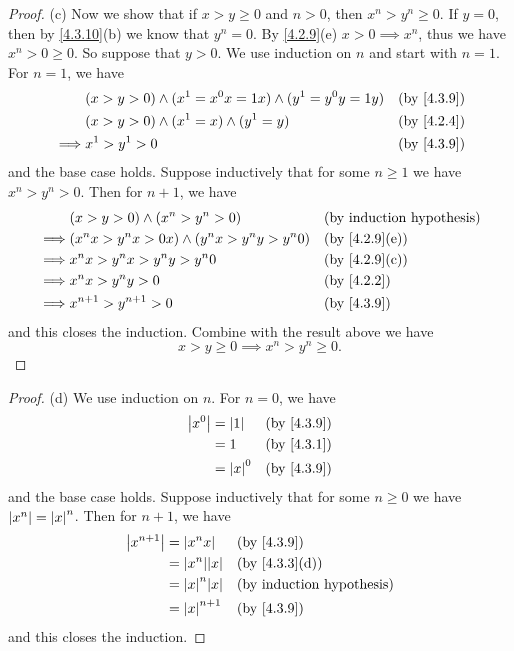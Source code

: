 \begin{proof}{(c)}
  Now we show that if \(x > y \geq 0\) and \(n > 0\), then \(x^n > y^n \geq 0\).
  If \(y = 0\), then by \cref{4.3.10}(b) we know that \(y^n = 0\).
  By \cref{4.2.9}(e) \(x > 0 \implies x^n\), thus we have \(x^n > 0 \geq 0\).
  So suppose that \(y > 0\).
  We use induction on \(n\) and start with \(n = 1\).
  For \(n = 1\), we have
  \begin{align*}
             & (x > y > 0) \land (x^1 = x^0 x = 1x) \land (y^1 = y^0 y = 1y) &  & \text{(by \cref{4.3.9})} \\
             & (x > y > 0) \land (x^1 = x) \land (y^1 = y)                   &  & \text{(by \cref{4.2.4})} \\
    \implies & x^1 > y^1 > 0                                                 &  & \text{(by \cref{4.3.9})}
  \end{align*}
  and the base case holds.
  Suppose inductively that for some \(n \geq 1\) we have \(x^n > y^n > 0\).
  Then for \(n + 1\), we have
  \begin{align*}
             & (x > y > 0) \land (x^n > y^n > 0)                  &  & \text{(by induction hypothesis)} \\
    \implies & (x^n x > y^n x > 0x) \land (y^n x > y^n y > y^n 0) &  & \text{(by \cref{4.2.9}(e))}      \\
    \implies & x^n x > y^n x > y^n y > y^n 0                      &  & \text{(by \cref{4.2.9}(c))}      \\
    \implies & x^n x > y^n y > 0                                  &  & \text{(by \cref{4.2.2})}         \\
    \implies & x^{n + 1} > y^{n + 1} > 0                          &  & \text{(by \cref{4.3.9})}
  \end{align*}
  and this closes the induction.
  Combine with the result above we have
  \[
    x > y \geq 0 \implies x^n > y^n \geq 0.
  \]
\end{proof}

\begin{proof}{(d)}
  We use induction on \(n\).
  For \(n = 0\), we have
  \begin{align*}
    \abs{x^0} & = \abs{1}   &  & \text{(by \cref{4.3.9})} \\
              & = 1         &  & \text{(by \cref{4.3.1})} \\
              & = \abs{x}^0 &  & \text{(by \cref{4.3.9})}
  \end{align*}
  and the base case holds.
  Suppose inductively that for some \(n \geq 0\) we have \(\left\lvert x^n\right\rvert = \left\lvert x\right\rvert^n\).
  Then for \(n + 1\), we have
  \begin{align*}
    \abs{x^{n + 1}} & = \abs{x^n x}       &  & \text{(by \cref{4.3.9})}         \\
                    & = \abs{x^n} \abs{x} &  & \text{(by \cref{4.3.3}(d))}      \\
                    & = \abs{x}^n \abs{x} &  & \text{(by induction hypothesis)} \\
                    & = \abs{x}^{n + 1}   &  & \text{(by \cref{4.3.9})}
  \end{align*}
  and this closes the induction.
\end{proof}

